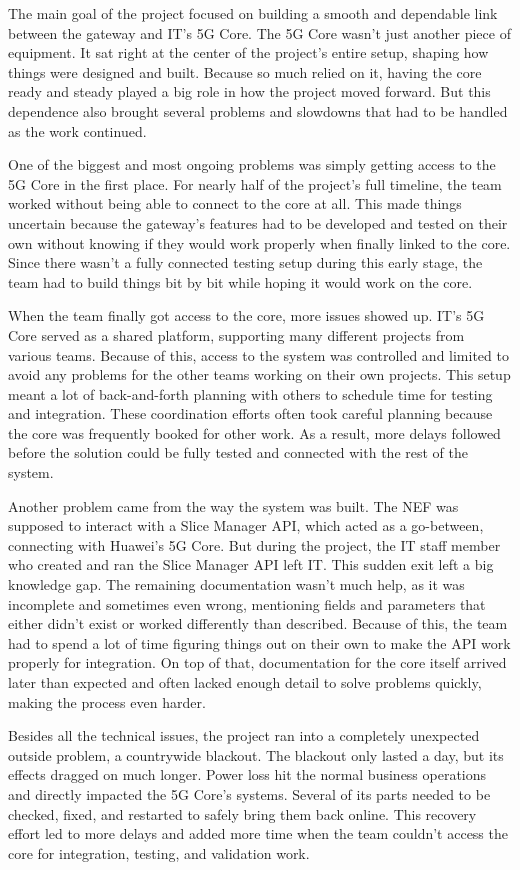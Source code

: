 The main goal of the project focused on building a smooth and dependable link
between the gateway and IT's 5G Core. The 5G Core wasn’t just another piece of
equipment. It sat right at the center of the project’s entire setup, shaping
how things were designed and built. Because so much relied on it, having the
core ready and steady played a big role in how the project moved forward. But
this dependence also brought several problems and slowdowns that had to be
handled as the work continued.

One of the biggest and most ongoing problems was simply getting access to the
5G Core in the first place. For nearly half of the project’s full timeline, the
team worked without being able to connect to the core at all. This made things
uncertain because the gateway’s features had to be developed and tested on
their own without knowing if they would work properly when finally linked to
the core. Since there wasn’t a fully connected testing setup during this early
stage, the team had to build things bit by bit while hoping it would work on
the core.

When the team finally got access to the core, more issues showed up. IT’s 5G
Core served as a shared platform, supporting many different projects from
various teams. Because of this, access to the system was controlled and limited
to avoid any problems for the other teams working on their own projects. This
setup meant a lot of back-and-forth planning with others to schedule time for
testing and integration. These coordination efforts often took careful planning
because the core was frequently booked for other work. As a result, more delays
followed before the solution could be fully tested and connected with the rest
of the system.

Another problem came from the way the system was built. The NEF was supposed to
interact with a Slice Manager API, which acted as a go-between, connecting with
Huawei’s 5G Core. But during the project, the IT staff member who created and
ran the Slice Manager API left IT. This sudden exit left a big knowledge gap.
The remaining documentation wasn’t much help, as it was incomplete and
sometimes even wrong, mentioning fields and parameters that either didn’t exist
or worked differently than described. Because of this, the team had to spend a
lot of time figuring things out on their own to make the API work properly for
integration. On top of that, documentation for the core itself arrived later
than expected and often lacked enough detail to solve problems quickly, making
the process even harder.

Besides all the technical issues, the project ran into a completely unexpected
outside problem, a countrywide blackout. The blackout only lasted a day, but
its effects dragged on much longer. Power loss hit the normal business
operations and directly impacted the 5G Core’s systems. Several of its parts
needed to be checked, fixed, and restarted to safely bring them back online.
This recovery effort led to more delays and added more time when the team
couldn’t access the core for integration, testing, and validation work.
